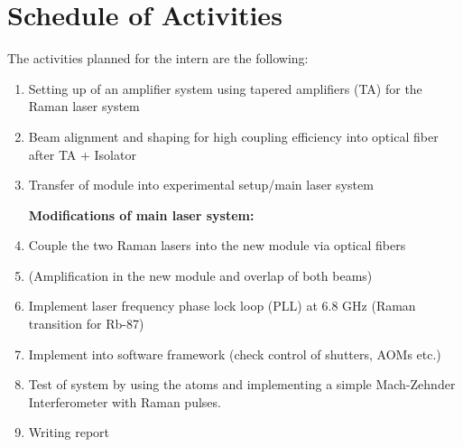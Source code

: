 \documentclass[english, a4paper, 11pt]{article}
\begin{document}
\section{Schedule of Activities}
The activities planned for the intern are the following:

\begin{enumerate}
    \item  Setting up of an amplifier system using tapered amplifiers (TA) for the Raman laser system

\item Beam alignment and shaping for high coupling efficiency into optical fiber after TA + Isolator

\item Transfer of module into experimental setup/main laser system

\textbf{Modifications of main laser system:}

\item Couple the two Raman lasers into the new module via optical fibers

\item (Amplification in the new module and overlap of both beams)
 
 \item Implement laser frequency phase lock loop (PLL) at 6.8 GHz (Raman transition for Rb-87)
 
 \item Implement into software framework (check control of shutters, AOMs etc.)

 \item  Test of system by using the atoms and implementing a simple Mach-Zehnder Interferometer with Raman pulses.

 \item Writing report
\end{enumerate}
\end{document}
